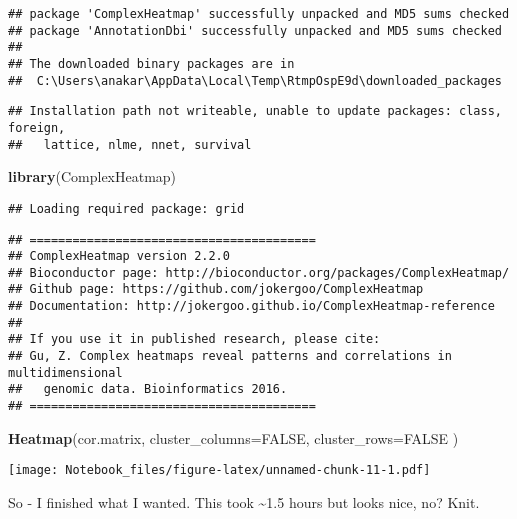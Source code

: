 \documentclass[
]{article}
\newenvironment{Shaded}{\begin{snugshade}}{\end{snugshade}}
\newcommand{\DataTypeTok}[1]{\textcolor[rgb]{0.13,0.29,0.53}{#1}}
\newcommand{\KeywordTok}[1]{\textcolor[rgb]{0.13,0.29,0.53}{\textbf{#1}}}
\newcommand{\NormalTok}[1]{#1}
\newcommand{\OtherTok}[1]{\textcolor[rgb]{0.56,0.35,0.01}{#1}}
\begin{document}
\begin{verbatim}
## package 'ComplexHeatmap' successfully unpacked and MD5 sums checked
## package 'AnnotationDbi' successfully unpacked and MD5 sums checked
## 
## The downloaded binary packages are in
##  C:\Users\anakar\AppData\Local\Temp\RtmpOspE9d\downloaded_packages
\end{verbatim}

\begin{verbatim}
## Installation path not writeable, unable to update packages: class, foreign,
##   lattice, nlme, nnet, survival
\end{verbatim}

\begin{Shaded}
\begin{Highlighting}[]
    \KeywordTok{library}\NormalTok{(ComplexHeatmap)}
\end{Highlighting}
\end{Shaded}

\begin{verbatim}
## Loading required package: grid
\end{verbatim}

\begin{verbatim}
## ========================================
## ComplexHeatmap version 2.2.0
## Bioconductor page: http://bioconductor.org/packages/ComplexHeatmap/
## Github page: https://github.com/jokergoo/ComplexHeatmap
## Documentation: http://jokergoo.github.io/ComplexHeatmap-reference
## 
## If you use it in published research, please cite:
## Gu, Z. Complex heatmaps reveal patterns and correlations in multidimensional 
##   genomic data. Bioinformatics 2016.
## ========================================
\end{verbatim}

\begin{Shaded}
\begin{Highlighting}[]
\KeywordTok{Heatmap}\NormalTok{(cor.matrix, }
        \DataTypeTok{cluster_columns=}\OtherTok{FALSE}\NormalTok{,}
        \DataTypeTok{cluster_rows=}\OtherTok{FALSE}
\NormalTok{)}
\end{Highlighting}
\end{Shaded}

\texttt{[image: Notebook\_files/figure-latex/unnamed-chunk-11-1.pdf]}

So - I finished what I wanted. This took \textasciitilde1.5 hours but
looks nice, no? Knit.
\end{document}
